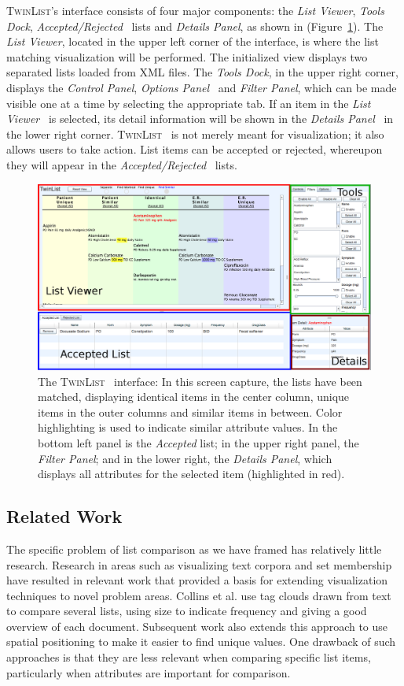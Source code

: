 \documentclass{chi2009}
\newcommand{\TwinList}{\textsc{TwinList}}
\newcommand{\ListViewer}{\textit{List Viewer}}
\newcommand{\AcceptedRejected}{\textit{Accepted/Rejected}}
\newcommand{\Details}{\textit{Details Panel}}
\newcommand{\Tools}{\textit{Tools Dock}}
\newcommand{\Controls}{\textit{Control Panel}}
\newcommand{\Filters}{\textit{Filter Panel}}
\newcommand{\Options}{\textit{Options Panel}}
\begin{document}
\TwinList's interface consists of four major components: the \ListViewer, \Tools, \AcceptedRejected~ lists and \Details, as shown in (Figure~\ref{fig:interface}). The \ListViewer, located in the upper left corner of the interface, is where the list matching visualization will be performed. The initialized view displays two separated lists loaded from XML files. The \Tools, in the upper right corner, displays the \Controls, \Options~ and \Filters, which can be made visible one at a time by selecting the appropriate tab. If an item in the \ListViewer~ is selected, its detail information will be shown in the \Details~ in the lower right corner. \TwinList~ is not merely meant for visualization; it also allows users to take action. List items can be accepted or rejected, whereupon they will appear in the \AcceptedRejected~ lists.

\begin{figure}[t]
\begin{center}
\includegraphics[width=1\linewidth]{img/interface2.png}
\end{center}
   \caption{The \TwinList~ interface: In this screen capture, the lists have been matched, displaying identical items in the center column, unique items in the outer columns and similar items in between. Color highlighting is used to indicate similar attribute values. In the bottom left panel is the \textit{Accepted} list; in the upper right panel, the \Filters; and in the lower right, the \Details, which displays all attributes for the selected item (highlighted in red).}
   \label{fig:interface}
\end{figure}

\subsection{Related Work}
The specific problem of list comparison as we have framed has relatively little research. Research in areas such as visualizing text corpora and set membership have resulted in relevant work that provided a basis for extending visualization techniques to novel problem areas.  Collins et al.\cite{collins2009parallel} use tag clouds drawn from text to compare several lists, using size to indicate frequency and giving a good overview of each document. Subsequent work also extends this approach to use spatial positioning to make it easier to find unique values\cite{conwaytuscon11}. One drawback of such approaches is that they are less relevant when comparing specific list items, particularly when attributes are important for comparison. 
\end{document}
